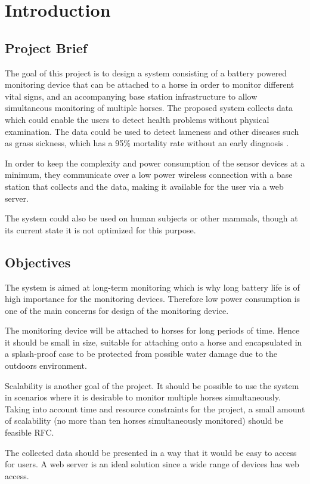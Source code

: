 \chapter{Introduction}


\section{Project Brief}
The goal of this project is to design a system consisting of a battery powered monitoring device that can be attached to a horse in order to monitor different vital signs, and an accompanying base station infrastructure to allow simultaneous monitoring of multiple horses. The proposed system collects data which could enable the users to detect health problems without physical examination. The data could be used to detect lameness and other diseases such as grass sickness, which has a 95\% mortality rate without an early diagnosis . 

In order to keep the complexity and power consumption of the sensor devices at a minimum, they communicate over a low power wireless connection with a base station that collects and the data, making it available for the user via a web server.

The system could also be used on human subjects or other mammals, though at its current state it is not optimized for this purpose.


\section{Objectives}
The system is aimed at long-term monitoring which is why long battery life is of high importance for the monitoring devices. Therefore low power consumption is one of the main concerns for design of the monitoring device.

The monitoring device will be attached to horses for long periods of time. Hence it should be small in size, suitable for attaching onto a horse and encapsulated in a splash-proof case to be protected from possible water damage due to the outdoors environment.

Scalability is another goal of the project. It should be possible to use the system in scenarios where it is desirable to monitor multiple horses simultaneously. Taking into account time and resource constraints for the project, a small amount of scalability (no more than ten horses simultaneously monitored) should be feasible RFC.

The collected data should be presented in a way that it would be easy to access for users. A web server is an ideal solution since a wide range of devices has web access.   
